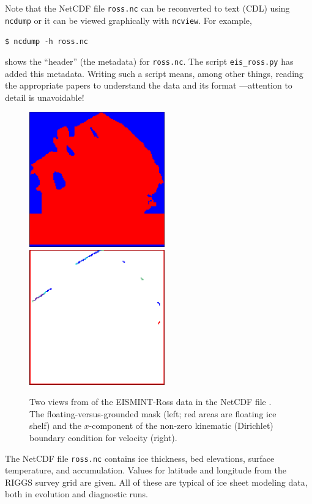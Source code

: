 \documentclass[11pt,final]{amsart}
\begin{document}
Note that the NetCDF file \verb|ross.nc| can be reconverted to text (CDL) using \verb|ncdump| or it can be viewed graphically with \verb|ncview|.  For example,

\verb|$ ncdump -h ross.nc|

\noindent shows the ``header'' (the metadata) for \verb|ross.nc|.  The script \verb|eis_ross.py| has added this metadata.  Writing such a script means, among other things, reading the appropriate papers to understand the data and its format \cite{RIGGS2,RIGGS1,MacAyealetal}---attention to detail is unavoidable!

\begin{figure}[ht]
\includegraphics[height=2.3in,keepaspectratio=true]{figs/rossmask} \qquad \includegraphics[height=2.3in,keepaspectratio=true]{figs/rossubar}
\caption{Two views from  of the EISMINT-Ross data in the NetCDF file .  The floating-versus-grounded mask (left; red areas are floating ice shelf) and the $x$-component of the non-zero kinematic (Dirichlet) boundary condition for velocity (right).}
\label{fig:rossmaskubar}
\end{figure}

The NetCDF file \verb|ross.nc| contains ice thickness, bed elevations, surface temperature, and accumulation.  Values for latitude and longitude from the RIGGS survey grid \cite{RIGGS1} are given.  All of these are typical of ice sheet modeling data, both in evolution and diagnostic runs.
\end{document}
